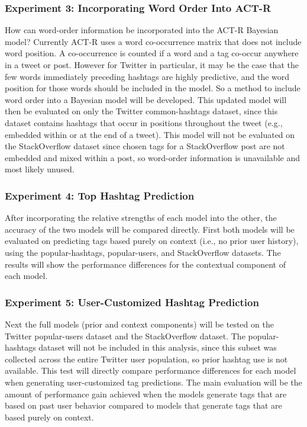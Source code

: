 \documentclass[man,floatsintext,donotrepeattitle]{apa6}
\begin{document}
\subsubsection{Experiment 3: Incorporating Word Order Into ACT-R}

How can word-order information be incorporated into the ACT-R Bayesian model?
Currently ACT-R uses a word co-occurrence matrix that does not include word position.
A co-occurrence is counted if a word and a tag co-occur anywhere in a tweet or post.
However for Twitter in particular, it may be the case that the few words immediately preceding hashtags are highly predictive, and the word position for those words should be included in the model.
So a method to include word order into a Bayesian model will be developed.
This updated model will then be evaluated on only the Twitter common-hashtags dataset, since this dataset contains hashtags that occur in positions throughout the tweet (e.g., embedded within or at the end of a tweet).
This model will not be evaluated on the StackOverflow dataset since chosen tags for a StackOverflow post are not embedded and mixed within a post, so word-order information is unavailable and most likely unused.

\subsubsection{Experiment 4: Top Hashtag Prediction}

After incorporating the relative strengths of each model into the other, the accuracy of the two models will be compared directly.
First both models will be evaluated on predicting tags based purely on context (i.e., no prior user history), using the popular-hashtags, popular-users, and StackOverflow datasets.
The results will show the performance differences for the contextual component of each model.

\subsubsection{Experiment 5: User-Customized Hashtag Prediction}

Next the full models (prior and context components) will be tested on the Twitter popular-users dataset and the StackOverflow dataset.
The popular-hashtags dataset will not be included in this analysis, since this subset was collected across the entire Twitter user population, so prior hashtag use is not available.
This test will directly compare performance differences for each model when generating user-customized tag predictions.
The main evaluation will be the amount of performance gain achieved when the models generate tags that are based on past user behavior compared to models that generate tags that are based purely on context.
\end{document}
